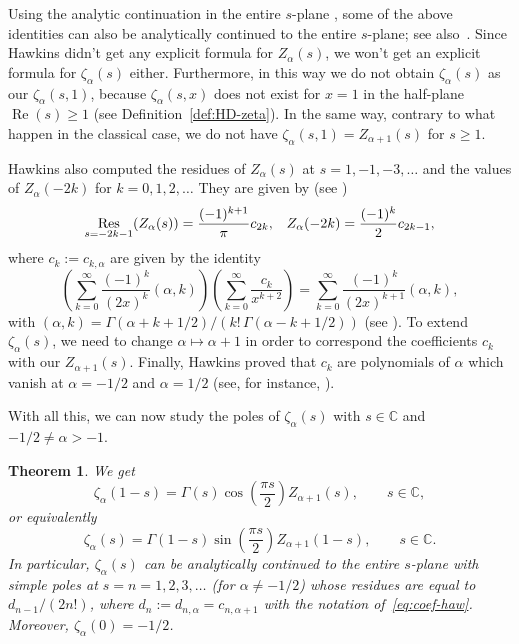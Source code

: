 \documentclass[a4paper]{amsart}
\newcommand{\C}{\mathbb{C}}
\renewcommand{\Re}{\operatorname{Re}}
\newcommand{\Res}{\operatornamewithlimits{Res}}
\theoremstyle{plain}
\newtheorem{theorem}{Theorem}[section]
\theoremstyle{definition}
\theoremstyle{remark}
\numberwithin{equation}{section}
\begin{document}
Using the analytic continuation in the entire $s$-plane \cite{Haw}, some of the above identities can also be analytically continued to the entire $s$-plane; see also~\cite{Sto}. Since Hawkins didn't get any explicit formula for $Z_{\alpha}(s)$, we won't get an explicit formula for $\zeta_\alpha(s)$ either. Furthermore, in this way we do not obtain $\zeta_{\alpha}(s)$ as our $\zeta_{\alpha}(s,1)$, because $\zeta_{\alpha}(s,x)$ does not exist for $x=1$ in the half-plane $\Re(s) \ge 1$ (see Definition~\ref{def:HD-zeta}). In the same way, contrary to what happen in the classical case, we do not have $\zeta_{\alpha}(s,1) = Z_{\alpha+1}(s)$ for $s\ge 1$. 

Hawkins also computed the residues of $Z_{\alpha}(s)$ at $s=1,-1,-3,\dots$ and the values of $Z_{\alpha}(-2k)$ for $k=0,1,2,\dots$ They are given by (see \cite[Theorem~3.5]{Haw})
\begin{align*}
\Res_{s=-2k-1} ( Z_{\alpha}(s) ) = \frac{(-1)^{k+1}}{\pi}c_{2k},
& &
 Z_{\alpha}(-2k) = \frac{(-1)^{k}}{2}c_{2k-1},
\end{align*}
where $c_k := c_{k,\alpha}$ are given by the identity
\begin{equation}
\label{eq:coef-haw}
\left(\sum_{k=0}^{\infty} \frac{(-1)^k}{(2x)^k} (\alpha,k)\right) 
\left(\sum_{k=0}^{\infty} \frac{c_k}{x^{k+2}} \right)
=
\sum_{k=0}^{\infty} \frac{(-1)^k}{(2x)^{k+1}}(\alpha,k), 
\end{equation}
with
$(\alpha,k) = \Gamma(\alpha+k+1/2) / (k!\,\Gamma(\alpha-k+1/2))$
(see \cite[Lemma~3.4]{Haw}). To extend $\zeta_\alpha(s)$, we need to change $\alpha\mapsto \alpha+1$ in order to correspond the coefficients $c_k$ with our $Z_{\alpha+1}(s)$. Finally, Hawkins proved that $c_k$ are polynomials of $\alpha$ which vanish at $\alpha=-1/2$ and $\alpha=1/2$ (see, for instance, \cite[Proposition~4.2]{Haw}).

With all this, we can now study the poles of $\zeta_\alpha(s)$ with $s\in \C$ and $-1/2 \not = \alpha>-1$.

\begin{theorem}
\label{teo:ZD-ext}
We get
\begin{equation}
\label{eq:ZD-cos-ext}
\zeta_{\alpha}(1-s) = \Gamma(s) \cos{\left(\frac{\pi s}{2}\right)} Z_{\alpha+1}(s), \qquad s \in \C,
\end{equation}
or equivalently
\begin{equation}
\label{eq:ZD-sin-ext}
\zeta_{\alpha}(s) = \Gamma(1-s) \sin{\left(\frac{\pi s}{2}\right)}Z_{\alpha+1}(1-s), \qquad s \in \C.
\end{equation}
In particular, $\zeta_\alpha(s)$ can be analytically continued to the entire $s$-plane with simple poles at $s = n = 1,2,3,\dots$ (for $\alpha\not = -1/2$) whose residues are equal to $d_{n-1}/(2n!)$, where $d_n := d_{n,\alpha} = c_{n,\alpha+1}$ with the notation of~\eqref{eq:coef-haw}. Moreover, $\zeta_\alpha(0) = -1/2$.
\end{theorem}
\end{document}
